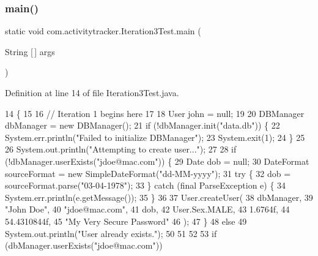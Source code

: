 \subsubsection{\texorpdfstring{main()}{main()}}
{\footnotesize\ttfamily static void com.\+activitytracker.\+Iteration3\+Test.\+main (\begin{DoxyParamCaption}\item[{String \mbox{[}$\,$\mbox{]}}]{args }\end{DoxyParamCaption})\hspace{0.3cm}{\ttfamily [static]}}



Definition at line 14 of file Iteration3\+Test.\+java.


\begin{DoxyCode}
14                                            \{
15 
16         \textcolor{comment}{// Iteration 1 begins here}
17 
18         User john = null;
19 
20         DBManager dbManager = \textcolor{keyword}{new} DBManager();
21         \textcolor{keywordflow}{if} (!dbManager.init(\textcolor{stringliteral}{"data.db"})) \{
22             System.err.println(\textcolor{stringliteral}{"Failed to initialize DBManager"});
23             System.exit(1);
24         \}
25 
26         System.out.println(\textcolor{stringliteral}{"Attempting to create user..."});
27 
28         \textcolor{keywordflow}{if} (!dbManager.userExists(\textcolor{stringliteral}{"jdoe@mac.com"})) \{
29             Date dob = null;
30             DateFormat sourceFormat = \textcolor{keyword}{new} SimpleDateFormat(\textcolor{stringliteral}{"dd-MM-yyyy"});
31             \textcolor{keywordflow}{try} \{
32                 dob = sourceFormat.parse(\textcolor{stringliteral}{"03-04-1978"});
33             \} \textcolor{keywordflow}{catch} (\textcolor{keyword}{final} ParseException e) \{
34                 System.err.println(e.getMessage());
35             \}
36 
37             User.createUser(
38                     dbManager,
39                     \textcolor{stringliteral}{"John Doe"},
40                     \textcolor{stringliteral}{"jdoe@mac.com"},
41                     dob,
42                     User.Sex.MALE,
43                     1.6764f,
44                     54.4310844f,
45                     \textcolor{stringliteral}{"My Very Secure Password"}
46             );
47         \}
48         \textcolor{keywordflow}{else}
49             System.out.println(\textcolor{stringliteral}{"User already exists."});
50 
51 
52 
53         \textcolor{keywordflow}{if} (dbManager.userExists(\textcolor{stringliteral}{"jdoe@mac.com"}))

\end{DoxyCode}
